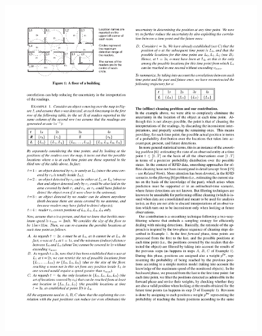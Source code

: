 \begin{frame}
\begin{columns}
  \begin{figure}[tb]
    \includegraphics[width=\columnwidth]{figures/3-4/3-4-14.pdf}
  \end{figure}


\end{columns}

\end{frame}


